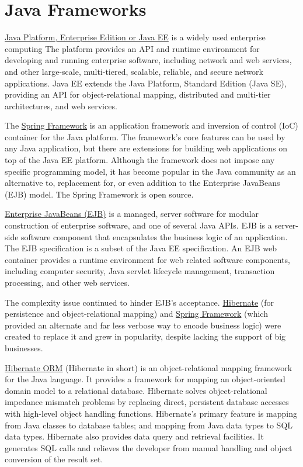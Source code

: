 \section{Java Frameworks}


\href{https://en.wikipedia.org/wiki/Java_Platform,_Enterprise_Edition}{Java
Platform, Enterprise Edition or Java EE} is a widely used enterprise computing
The platform provides an API and runtime environment for developing and running
enterprise software, including network and web services, and other large-scale, multi-tiered, scalable, reliable, and secure network applications. 
Java EE extends the Java Platform, Standard Edition (Java SE), providing an API for object-relational mapping, distributed and multi-tier architectures, and web services.

The \href{https://en.wikipedia.org/wiki/Spring_Framework}{Spring Framework} is
an application framework and inversion of control (IoC) container for the Java platform.
The framework's core features can be used by any Java application, but there are extensions for building web applications on top of the Java EE platform. 
Although the framework does not impose any specific programming model, 
it has become popular in the Java community as an alternative to, replacement for, or even addition to the Enterprise JavaBeans (EJB) model. 
The Spring Framework is open source.


\href{https://en.wikipedia.org/wiki/Enterprise_JavaBeans}{Enterprise JavaBeans (EJB)} 
is a managed, server software for modular construction of enterprise
software, and one of several Java APIs.
EJB is a server-side software component that encapsulates the business logic of an application.
The EJB specification is a subset of the Java EE specification. 
An EJB web container provides a runtime environment for web related software components, including computer security, Java servlet lifecycle management, transaction processing, and other web services.

The complexity issue continued to hinder EJB's acceptance.
\href{https://en.wikipedia.org/wiki/Hibernate_(framework)}{Hibernate} (for persistence and object-relational mapping) and 
\href{https://en.wikipedia.org/wiki/Spring_Framework}{Spring Framework} (which provided an alternate and far less verbose way to encode
business logic) were created to replace it and grew in popularity, despite
lacking the support of big businesses.


\href{https://en.wikipedia.org/wiki/Hibernate_(framework)}{Hibernate ORM} 
(Hibernate in short) is an object-relational mapping framework for the Java language. 
It provides a framework for mapping an object-oriented domain model to a relational database. 
Hibernate solves object-relational impedance mismatch problems by replacing direct, persistent database accesses with high-level object handling functions.
Hibernate's primary feature is mapping from Java classes to database tables; and
mapping from Java data types to SQL data types. Hibernate also provides data query and retrieval facilities. It generates SQL calls and relieves the developer from manual handling and object conversion of the result set.

